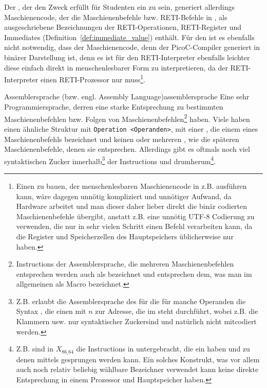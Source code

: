 Der , der den Zweck erfüllt für Studenten ein  zu sein, generiert allerdings Maschienencode, der die Maschienenbefehle bzw. RETI-Befehle in , als ausgeschriebene Bezeichnungen der RETI-Operationen, RETI-Register und Immediates (Definition~\ref{def:immediate_value}) enthält. Für den  ist es ebenfalls nicht notwendig, dass der Maschienencode, denn der PicoC-Compiler generiert in binärer Darstellung ist, denn es ist für den RETI-Interpreter ebenfalls leichter diese einfach direkt in menschenlesbarer Form zu interpretieren, da der RETI-Interpreter einen RETI-Prozessor nur  muss\footnote{Einen  zu bauen, der menschenlesbaren Maschienencode in z.B.  ausführen kann, wäre dagegen unnötig kompliziert und unnötiger Aufwand, da Hardware  arbeitet und man dieser daher lieber direkt die binär codierten Maschienenbefehle übergibt, anstatt z.B. eine unnötig  UTF-8 Codierung zu verwenden, die nur in sehr vielen Schritt einen Befehl verarbeiten kann, da die Register und Speicherzellen des Hauptspeichers üblicherweise nur  haben.}.

  \begin{Definition}{Assemblersprache (bzw. engl. Assembly Language)}{assemblersprache}
    Eine sehr  Programmiersprache, derren  eine starke Entsprechung zu bestimmten Maschienenbefehlen bzw. Folgen von Maschienenbefehlen\footnote{Instructions der Assemblersprache, die mehreren Maschienenbefehlen entsprechen werden auch als  bezeichnet und entsprechen dem, was man im allgemeinen als Macro bezeichnet.} haben.
    Viele  haben einen ähnliche Struktur mit \verb|Operation <Operanden>|, mit einer , die einem  eines Maschienenbefehls bezeichnet und keinen oder mehreren , wie die späteren Maschienenbefehle, denen sie entsprechen. Allerdings gibt es oftmals noch viel \glqq syntaktischen Zucker\grqq\; innerhalb\footnote{Z.B. erlaubt die Assemblersprache des  für die  für manche Operanden die Syntax , die einen  mit  $n$ zur Adresse, die im   steht durchführt, wobei z.B. die Klammern \smalltt{()} usw. nur \glqq syntaktischer Zucker\grqq sind und natürlich nicht mitcodiert werden.} der Instructions und drumherum\footnote{Z.B. sind in $X_{86\_64}$ die Instructions in  untergebracht, die ein  haben und zu denen mittels   gesprungen werden kann. Ein solches Konstrukt, was vor allem auch noch relativ beliebig wählbare Bezeichner verwendet kann keine direkte Entsprechung in einem Prozessor und Hauptspeicher haben.}.
  \end{Definition}

